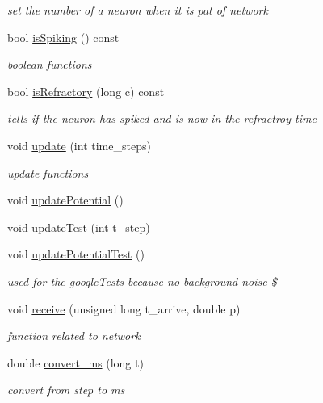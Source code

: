 \begin{DoxyCompactItemize}
\begin{DoxyCompactList}\small\item\em set the number of a neuron when it is pat of network \end{DoxyCompactList}\item 
bool \hyperlink{classNeuron_a80bb77af9e3d56e6986e0d78b8ba1010}{is\-Spiking} () const 
\begin{DoxyCompactList}\small\item\em boolean functions \end{DoxyCompactList}\item 
bool \hyperlink{classNeuron_a1c42205232c387e6e48fd7a34917a4a9}{is\-Refractory} (long c) const 
\begin{DoxyCompactList}\small\item\em tells if the neuron has spiked and is now in the refractroy time \end{DoxyCompactList}\item 
void \hyperlink{classNeuron_a45a02b0b5c11ef36083fc127f7d61da4}{update} (int time\-\_\-steps)
\begin{DoxyCompactList}\small\item\em update functions \end{DoxyCompactList}\item 
void \hyperlink{classNeuron_ab521aac5bf7eb98555d0bb30ce7a4010}{update\-Potential} ()
\item 
void \hyperlink{classNeuron_a7ed9af4caf30896e8e40d97f20eee086}{update\-Test} (int t\-\_\-step)
\item 
void \hyperlink{classNeuron_acb7c3b98dc58fd54fbfc2340f8f3be80}{update\-Potential\-Test} ()
\begin{DoxyCompactList}\small\item\em used for the google\-Tests because no background noise \$ \end{DoxyCompactList}\item 
void \hyperlink{classNeuron_a0b39578c9fe2addc040b48996a42007d}{receive} (unsigned long t\-\_\-arrive, double p)
\begin{DoxyCompactList}\small\item\em function related to network \end{DoxyCompactList}\item 
\hypertarget{classNeuron_a20f5ed3573a1d9744937340d72daeea2}{double \hyperlink{classNeuron_a20f5ed3573a1d9744937340d72daeea2}{convert\-\_\-ms} (long t)}\label{classNeuron_a20f5ed3573a1d9744937340d72daeea2}

\begin{DoxyCompactList}\small\item\em convert from step to ms \end{DoxyCompactList}\end{DoxyCompactItemize}



